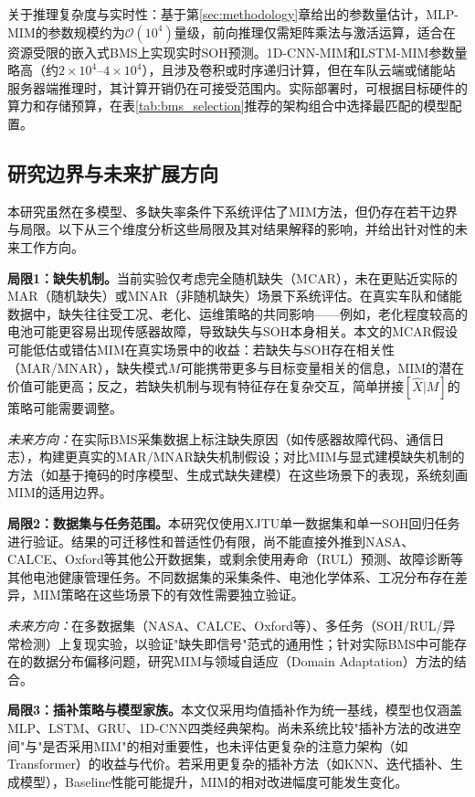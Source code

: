 \documentclass[10pt,a4paper]{ctexart}
\begin{document}
关于推理复杂度与实时性：基于第\ref{sec:methodology}章给出的参数量估计，MLP-MIM的参数规模约为$\mathcal{O}(10^4)$量级，前向推理仅需矩阵乘法与激活运算，适合在资源受限的嵌入式BMS上实现实时SOH预测。1D-CNN-MIM和LSTM-MIM参数量略高（约$2\times10^4$--$4\times10^4$），且涉及卷积或时序递归计算，但在车队云端或储能站服务器端推理时，其计算开销仍在可接受范围内。实际部署时，可根据目标硬件的算力和存储预算，在表\ref{tab:bms_selection}推荐的架构组合中选择最匹配的模型配置。

\subsection{研究边界与未来扩展方向}

本研究虽然在多模型、多缺失率条件下系统评估了MIM方法，但仍存在若干边界与局限。以下从三个维度分析这些局限及其对结果解释的影响，并给出针对性的未来工作方向。

\textbf{局限1：缺失机制。}当前实验仅考虑完全随机缺失（MCAR），未在更贴近实际的MAR（随机缺失）或MNAR（非随机缺失）场景下系统评估。在真实车队和储能数据中，缺失往往受工况、老化、运维策略的共同影响——例如，老化程度较高的电池可能更容易出现传感器故障，导致缺失与SOH本身相关。本文的MCAR假设可能低估或错估MIM在真实场景中的收益：若缺失与SOH存在相关性（MAR/MNAR），缺失模式$M$可能携带更多与目标变量相关的信息，MIM的潜在价值可能更高；反之，若缺失机制与现有特征存在复杂交互，简单拼接$[\hat{X}|M]$的策略可能需要调整。

\textit{未来方向：}在实际BMS采集数据上标注缺失原因（如传感器故障代码、通信日志），构建更真实的MAR/MNAR缺失机制假设；对比MIM与显式建模缺失机制的方法（如基于掩码的时序模型、生成式缺失建模）在这些场景下的表现，系统刻画MIM的适用边界。

\textbf{局限2：数据集与任务范围。}本研究仅使用XJTU单一数据集和单一SOH回归任务进行验证。结果的可迁移性和普适性仍有限，尚不能直接外推到NASA、CALCE、Oxford等其他公开数据集，或剩余使用寿命（RUL）预测、故障诊断等其他电池健康管理任务。不同数据集的采集条件、电池化学体系、工况分布存在差异，MIM策略在这些场景下的有效性需要独立验证。

\textit{未来方向：}在多数据集（NASA、CALCE、Oxford等）、多任务（SOH/RUL/异常检测）上复现实验，以验证"缺失即信号"范式的通用性；针对实际BMS中可能存在的数据分布偏移问题，研究MIM与领域自适应（Domain Adaptation）方法的结合。

\textbf{局限3：插补策略与模型家族。}本文仅采用均值插补作为统一基线，模型也仅涵盖MLP、LSTM、GRU、1D-CNN四类经典架构。尚未系统比较"插补方法的改进空间"与"是否采用MIM"的相对重要性，也未评估更复杂的注意力架构（如Transformer）的收益与代价。若采用更复杂的插补方法（如KNN、迭代插补、生成模型），Baseline性能可能提升，MIM的相对改进幅度可能发生变化。
\end{document}
